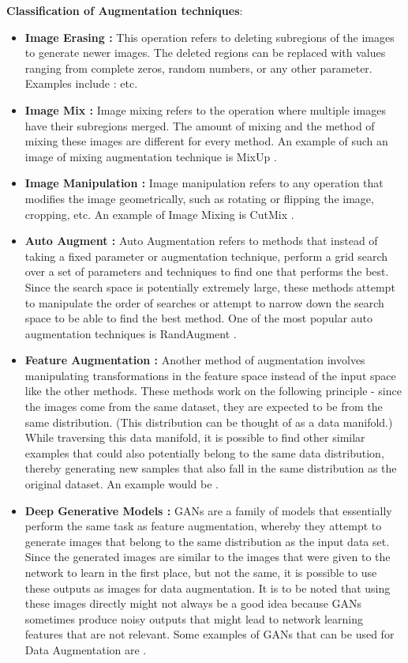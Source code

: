 \documentclass[a4paper,11pt,openright]{book}
\begin{document}
\textbf{Classification of Augmentation techniques}:
\begin{itemize}
\item \textbf{Image Erasing :} This operation refers to deleting subregions of the images to generate newer images. The deleted regions can be replaced with values ranging from complete zeros, random numbers, or any other parameter. Examples include : \cite{zhongRandomErasingData2020,chenGridMaskDataAugmentation2020,singhHideandSeekDataAugmentation2018} etc.
\item \textbf{Image Mix :} Image mixing refers to the operation where multiple images have their subregions merged. The amount of mixing and the method of mixing these images are different for every method. An example of such an image of mixing augmentation technique is MixUp \cite{zhangMixupEmpiricalRisk2018}.
\item \textbf{Image Manipulation :} Image manipulation refers to any operation that modifies the image geometrically, such as rotating or flipping the image, cropping, etc. An example of Image Mixing is CutMix \cite{yunCutMixRegularizationStrategy2019a}.
\item \textbf{Auto Augment :} Auto Augmentation refers to methods that instead of taking a fixed parameter or augmentation technique, perform a grid search over a set of parameters and techniques to find one that performs the best. Since the search space is potentially extremely large, these methods attempt to manipulate the order of searches or attempt to narrow down the search space to be able to find the best method. One of the most popular auto augmentation techniques is RandAugment \cite{cubukRandaugmentPracticalAutomated2020}.
\item \textbf{Feature Augmentation :} Another method of augmentation involves manipulating transformations in the feature space instead of the input space like the other methods. These methods work on the following principle - since the images come from the same dataset, they are expected to be from the same distribution. (This distribution can be thought of as a data manifold.) While traversing this data manifold, it is possible to find other similar examples that could also potentially belong to the same data distribution, thereby generating new samples that also fall in the same distribution as the original dataset. An example would be \cite{devriesImprovedRegularizationConvolutional2017}.
\item \textbf{Deep Generative Models :} GANs are a family of models that essentially perform the same task as feature augmentation, whereby they attempt to generate images that belong to the same distribution as the input data set. Since the generated images are similar to the images that were given to the network to learn in the first place, but not the same, it is possible to use these outputs as images for data augmentation. It is to be noted that using these images directly might not always be a good idea because GANs sometimes produce noisy outputs that might lead to network learning features that are not relevant. Some examples of GANs that can be used for Data Augmentation are \cite{choiStarGANV2Diverse2020,isolaImagetoImageTranslationConditional2018}.
\end{itemize}
\end{document}
